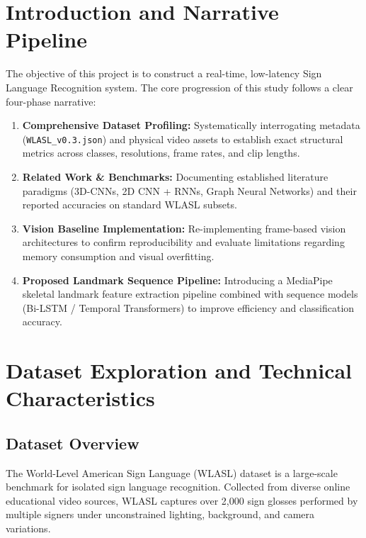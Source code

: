 \documentclass[12pt,a4paper]{article}
\begin{document}
\begin{titlepage}
    \vspace{1cm}
\end{titlepage}

\newpage
\thispagestyle{plain}
\renewcommand{\contentsname}{\textcolor{primaryblue}{Table of Contents}}
\tableofcontents
\newpage

\section{Introduction and Narrative Pipeline}
The objective of this project is to construct a real-time, low-latency Sign Language Recognition system. The core progression of this study follows a clear four-phase narrative:
\begin{enumerate}
    \item \textbf{Comprehensive Dataset Profiling:} Systematically interrogating metadata (\texttt{WLASL\_v0.3.json}) and physical video assets to establish exact structural metrics across classes, resolutions, frame rates, and clip lengths.
    \item \textbf{Related Work \& Benchmarks:} Documenting established literature paradigms (3D-CNNs, 2D CNN + RNNs, Graph Neural Networks) and their reported accuracies on standard WLASL subsets.
    \item \textbf{Vision Baseline Implementation:} Re-implementing frame-based vision architectures to confirm reproducibility and evaluate limitations regarding memory consumption and visual overfitting.
    \item \textbf{Proposed Landmark Sequence Pipeline:} Introducing a MediaPipe skeletal landmark feature extraction pipeline combined with sequence models (Bi-LSTM / Temporal Transformers) to improve efficiency and classification accuracy.
\end{enumerate}

\section{Dataset Exploration and Technical Characteristics}

\subsection{Dataset Overview}
The World-Level American Sign Language (WLASL) dataset is a large-scale benchmark for isolated sign language recognition. Collected from diverse online educational video sources, WLASL captures over 2,000 sign glosses performed by multiple signers under unconstrained lighting, background, and camera variations.
\end{document}
